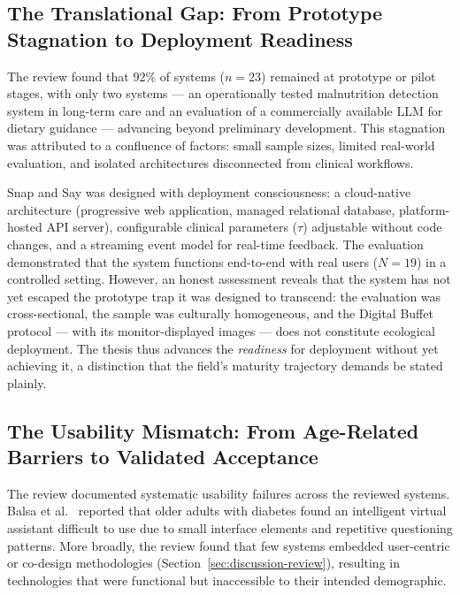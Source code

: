 \subsection{The Translational Gap: From Prototype Stagnation to Deployment Readiness}

The review found that $92\%$ of systems ($n=23$) remained at prototype or pilot stages, with only two systems --- an operationally tested malnutrition detection system in long-term care \citep{dimartinoMalnutritionRiskAssessment2021} and an evaluation of a commercially available LLM for dietary guidance \citep{wangAreNutritionalLabeling2024} --- advancing beyond preliminary development. This stagnation was attributed to a confluence of factors: small sample sizes, limited real-world evaluation, and isolated architectures disconnected from clinical workflows.

Snap and Say was designed with deployment consciousness: a cloud-native architecture (progressive web application, managed relational database, platform-hosted API server), configurable clinical parameters ($\tau$) adjustable without code changes, and a streaming event model for real-time feedback. The evaluation demonstrated that the system functions end-to-end with real users ($N=19$) in a controlled setting. However, an honest assessment reveals that the system has not yet escaped the prototype trap it was designed to transcend: the evaluation was cross-sectional, the sample was culturally homogeneous, and the Digital Buffet protocol --- with its monitor-displayed images --- does not constitute ecological deployment. The thesis thus advances the \emph{readiness} for deployment without yet achieving it, a distinction that the field's maturity trajectory demands be stated plainly.

\subsection{The Usability Mismatch: From Age-Related Barriers to Validated Acceptance}

The review documented systematic usability failures across the reviewed systems. Balsa et al.\ \citep{balsaUsabilityIntelligentVirtual2020} reported that older adults with diabetes found an intelligent virtual assistant difficult to use due to small interface elements and repetitive questioning patterns. More broadly, the review found that few systems embedded user-centric or co-design methodologies (Section~\ref{sec:discussion-review}), resulting in technologies that were functional but inaccessible to their intended demographic.

